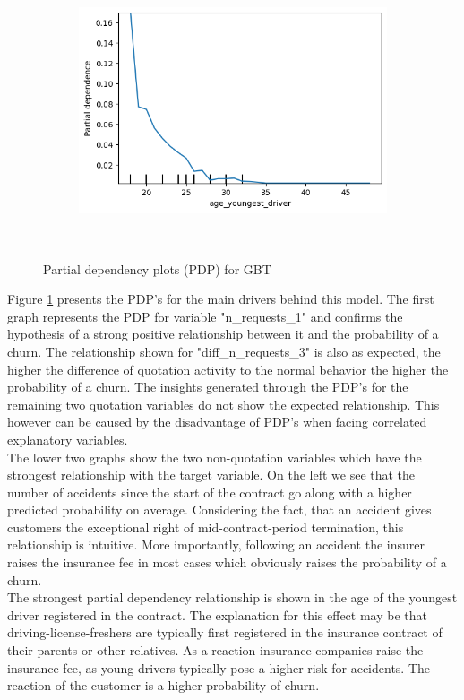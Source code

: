 \documentclass[12pt,titlepage]{article}
\begin{document}
\begin{figure}[h!]
\begin{subfigure}{.55\textwidth}
    \end{subfigure}%
    \begin{subfigure}{.55\textwidth}
        \centering
        \includegraphics[width=1\linewidth]{pdp_age_youngest_driver.png}
    \end{subfigure} \\
\caption{Partial dependency plots (PDP) for GBT}
\label{fig:pdp}
\end{figure}

Figure \ref{fig:pdp} presents the PDP's for the main drivers behind this model. The first graph represents the PDP for variable "n\_requests\_1" and confirms the hypothesis of a strong positive relationship between it and the probability of a churn. The relationship shown for "diff\_n\_requests\_3" is also as expected, the higher the difference of quotation activity to the normal behavior the higher the probability of a churn. The insights generated through the PDP's for the remaining two quotation variables do not show the expected relationship. This however can be caused by the disadvantage of PDP's when facing correlated explanatory variables. \\
The lower two graphs show the two non-quotation variables which have the strongest relationship with the target variable. On the left we see that the number of accidents since the start of the contract go along with a higher predicted probability on average. Considering the fact, that an accident gives customers the exceptional right of mid-contract-period termination, this relationship is intuitive. More importantly, following an accident the insurer raises the insurance fee in most cases which obviously raises the probability of a churn. \\
The strongest partial dependency relationship is shown in the age of the youngest driver registered in the contract. The explanation for this effect may be that driving-license-freshers are typically first registered in the insurance contract of their parents or other relatives. As a reaction insurance companies raise the insurance fee, as young drivers typically pose a higher risk for accidents. The reaction of the customer is a higher probability of churn. \\
\end{document}
